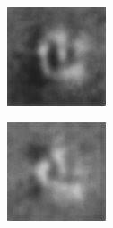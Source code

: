 \begin{figure}[H]
\begin{subfigure}[t]{0.13\textwidth}
  \end{subfigure}
  \begin{subfigure}[t]{0.13\textwidth}
    \centering
    \includegraphics[width=\linewidth]{img/one-trial/prediction_2_msssim.png}
  \end{subfigure}
  \begin{subfigure}[t]{0.13\textwidth}
    \centering
    \includegraphics[width=\linewidth]{img/one-trial/prediction_2_mix.png}

\end{subfigure}
\end{figure}
